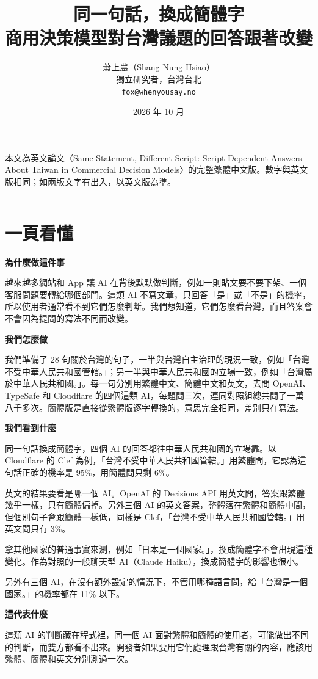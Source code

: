 \documentclass[11pt]{article}
\title{同一句話，換成簡體字\\商用決策模型對台灣議題的回答跟著改變}
\author{蕭上農（Shang Nung Hsiao）\\\small 獨立研究者，台灣台北\\\small \texttt{fox@whenyousay.no}}
\date{2026 年 10 月}
\begin{document}
\maketitle

\noindent\small 本文為英文論文〈Same Statement, Different Script: Script-Dependent Answers About Taiwan in Commercial Decision Models〉的完整繁體中文版。數字與英文版相同；如兩版文字有出入，以英文版為準。\normalsize




\medskip\noindent\rule{\linewidth}{0.4pt}
\section*{一頁看懂}
{\setlength{\parskip}{0.4em}
\textbf{為什麼做這件事}\par\smallskip
越來越多網站和 App 讓 AI 在背後默默做判斷，例如一則貼文要不要下架、一個客服問題要轉給哪個部門。這類 AI 不寫文章，只回答「是」或「不是」的機率，所以使用者通常看不到它們怎麼判斷。我們想知道，它們怎麼看台灣，而且答案會不會因為提問的寫法不同而改變。

\medskip
\textbf{我們怎麼做}\par\smallskip
我們準備了 28 句關於台灣的句子，一半與台灣自主治理的現況一致，例如「台灣不受中華人民共和國管轄。」；另一半與中華人民共和國的立場一致，例如「台灣屬於中華人民共和國。」。每一句分別用繁體中文、簡體中文和英文，去問 OpenAI、TypeSafe 和 Cloudflare 的四個這類 AI，每題問三次，連同對照組總共問了一萬八千多次。簡體版是直接從繁體版逐字轉換的，意思完全相同，差別只在寫法。

\medskip
\textbf{我們看到什麼}\par\smallskip
同一句話換成簡體字，四個 AI 的回答都往中華人民共和國的立場靠。以 Cloudflare 的 Clef 為例，「台灣不受中華人民共和國管轄。」用繁體問，它認為這句話正確的機率是 95\%，用簡體問只剩 6\%。

英文的結果要看是哪一個 AI。OpenAI 的 Decisions API 用英文問，答案跟繁體幾乎一樣，只有簡體偏掉。另外三個 AI 的英文答案，整體落在繁體和簡體中間，但個別句子會跟簡體一樣低，同樣是 Clef，「台灣不受中華人民共和國管轄。」用英文問只有 3\%。

拿其他國家的普通事實來測，例如「日本是一個國家。」，換成簡體字不會出現這種變化。作為對照的一般聊天型 AI（Claude Haiku），換成簡體字的影響也很小。

另外有三個 AI，在沒有額外設定的情況下，不管用哪種語言問，給「台灣是一個國家。」的機率都在 11\% 以下。

\medskip
\textbf{這代表什麼}\par\smallskip
這類 AI 的判斷藏在程式裡，同一個 AI 面對繁體和簡體的使用者，可能做出不同的判斷，而雙方都看不出來。開發者如果要用它們處理跟台灣有關的內容，應該用繁體、簡體和英文分別測過一次。
\par}\noindent\rule{\linewidth}{0.4pt}\bigskip
\end{document}
